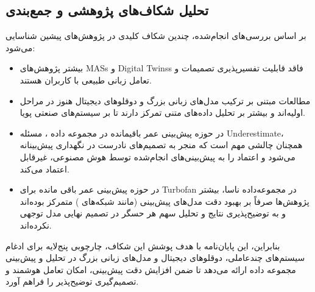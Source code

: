 \documentclass[a4paper,fleqn]{report}
\begin{document}
\subsection{تحلیل شکاف‌های پژوهشی و جمع‌بندی}
بر اساس بررسی‌های انجام‌شده، چندین شکاف کلیدی در پژوهش‌های پیشین شناسایی می‌شود:
\begin{itemize}
	\item
	 بیشتر پژوهش‌های 
	\glspl{MAS} و
	\glspl{Digital Twins}
	 فاقد قابلیت تفسیرپذیری تصمیمات و تعامل زبانی طبیعی با کاربران هستند.
	 
	\item
	 مطالعات مبتنی بر 
	ترکیب مدل‌های زبانی بزرگ و دوقلوهای دیجیتال
	 هنوز در مراحل اولیه‌اند و بیشتر بر تحلیل داده‌های متنی تمرکز دارند تا بر سیستم‌های صنعتی پویا.
	 
	\item
	 در حوزه پیش‌بینی عمر باقیمانده در مجموعه داده ، مسئله 
	 \gls{Underestimate}،
	  همچنان چالشی مهم است که منجر به تصمیم‌های نادرست در نگهداری پیش‌بینانه می‌شود و اعتماد را به پیش‌بینی‌های انجام‌شده توسط هوش مصنوعی، غیرقابل اعتماد می‌کند.
	
	\item
	در حوزه پیش‌بینی عمر باقی‌ مانده برای \gls{Turbofan} در مجموعه‌داده 
		ناسا، بیشتر پژوهش‌ها صرفاً بر بهبود دقت مدل‌های پیش‌بینی (مانند شبکه‌های ) متمرکز بوده‌اند و به توضیح‌پذیری نتایج و تحلیل سهم هر حسگر در تصمیم نهایی مدل توجهی نکرده‌اند.
	
	
\end{itemize}

بنابراین، این پایان‌نامه با هدف پوشش این شکاف، چارچوبی پنج‌لایه برای ادغام سیستم‌های چندعاملی، دوقلوهای دیجیتال و مدل‌های زبانی بزرگ در تحلیل و پیش‌بینی مجموعه داده  ارائه می‌دهد تا ضمن افزایش دقت پیش‌بینی، امکان تعامل هوشمند و تصمیم‌گیری توضیح‌پذیر را فراهم آورد.


\end{document}
